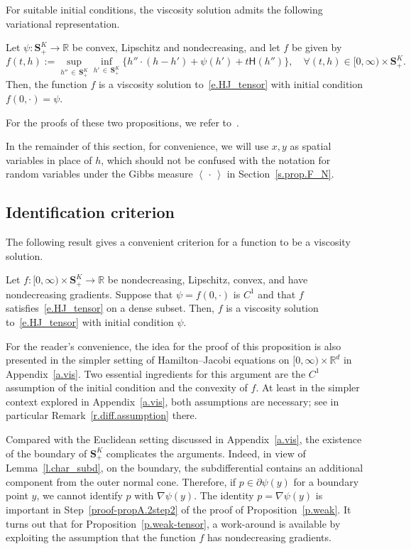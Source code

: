 \documentclass[AHL,Unicode,longabstracts,published]{cedram}
\newcommand{\R}{\mathbb{R}}
\renewcommand{\S}{\mathbf{S}}
\renewcommand{\H}{\mathsf{H}}
\newcommand{\la}{\left\langle}
\newcommand{\ra}{\right\rangle}
\let\oldforall\forall
\renewcommand*{\forall}{\mathrel{\oldforall}}
\begin{document}
For suitable initial conditions, the viscosity solution admits the following variational representation.
\begin{prop}\label{p.hopf}
Let $\psi:\S^K_+\rightarrow \R$ be convex, Lipschitz and nondecreasing, and let $f$ be given by
\[
f(t,h) := \sup_{h''\,\in\,\S^K_+}\inf_{h'\,\in\,\S^K_+}\big\{h''\cdot \left(h-h'\right)+\psi\left(h'\right)+t\H\left(h''\right)\big\},\quad \forall (t,h)\in[0,\infty)\times \S^K_+.
\]
Then, the function $f$ is a viscosity solution to~\eqref{e.HJ_tensor} with initial condition $f(0,\cdot)=\psi$.
\end{prop}


For the proofs of these two propositions, we refer to~\cite[Section~6]{HBJ}.


In the {remainder} of this section, for convenience, we will use $x,y$ as spatial variables in place of $h$, which should not be confused with the notation for random variables under the Gibbs measure $\la\,\cdot\,\ra$ in Section~\ref{s.prop.F_N}.



\subsection{Identification criterion}\label{s.suff_cond}

The following result gives a convenient criterion for a function to be a viscosity solution.

\begin{prop}\label{p.weak-tensor}
Let $f : [0,\infty) \times \S^K_+ \to \R$ be nondecreasing, Lipschitz, convex, and have nondecreasing gradients. Suppose that $\psi = f(0,\cdot)$ is $C^1$ and that $f$ satisfies~\eqref{e.HJ_tensor} on a dense subset. Then, $f$ is a viscosity solution to~\eqref{e.HJ_tensor} with initial condition $\psi$.
\end{prop}



For the reader's convenience, the idea for the proof of this proposition is also presented in the simpler setting of Hamilton--Jacobi equations on $[0,\infty)\times \R^d$ in Appendix~\ref{a.vis}. Two essential ingredients for this argument are the $C^1$ assumption of the initial condition and the convexity of $f$. At least in the simpler context explored in Appendix~\ref{a.vis}, both assumptions are necessary; see in particular Remark~\ref{r.diff.assumption} there.



Compared with the Euclidean setting discussed in Appendix~\ref{a.vis}, the existence of the boundary of $\S^K_+$ complicates the arguments. Indeed, in view of Lemma~\ref{l.char_subd}, on the boundary, the subdifferential contains an additional component from the outer normal cone. Therefore, if $p\in\partial \psi(y)$ for a boundary point $y$, we cannot identify $p$ with $\nabla \psi(y)$. The identity $p=\nabla \psi (y)$ is important in Step~\ref{proof-propA.2step2} of the proof of Proposition~\ref{p.weak}. It turns out that for Proposition~\ref{p.weak-tensor}, a work-around is available by exploiting the assumption that the function $f$ has nondecreasing gradients.
\end{document}
